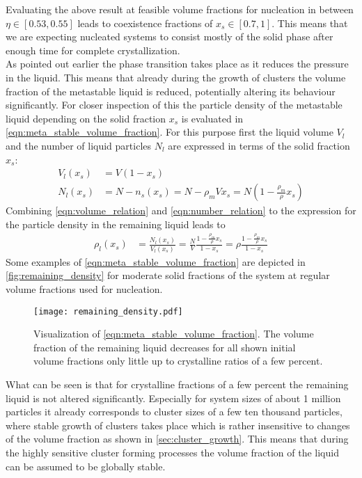 Evaluating the above result at feasible volume fractions for nucleation in between $\eta \in [0.53,0.55]$ leads to coexistence fractions of $x_s \in [0.7,1]$. This means that we are expecting nucleated systems to consist mostly of the solid phase after enough time for complete crystallization.\\

As pointed out earlier the phase transition takes place as it reduces the pressure in the liquid. This means that already during the growth of clusters the volume fraction of the metastable liquid is reduced, potentially altering its behaviour significantly. For closer inspection of this the particle density of the metastable liquid depending on the solid fraction $x_s$ is evaluated in \autoref{eqn:meta_stable_volume_fraction}. For this purpose first the liquid volume $V_l$ and the number of liquid particles $N_l$ are expressed in terms of the solid fraction $x_s$:
\begin{align}
\label{eqn:volume_relation}
V_l(x_s) & = V(1-x_s)\\
\label{eqn:number_relation}
N_l(x_s) & = N-n_s(x_s) = N - \rho_m V x_s = N(1-\frac{\rho_m}{\rho}x_s)
\end{align}
Combining \autoref{eqn:volume_relation} and \autoref{eqn:number_relation} to the expression for the particle density in the remaining liquid leads to
\begin{align}
\label{eqn:meta_stable_volume_fraction}
\rho_l(x_s) &= \frac{N_l (x_s) }{ V_l(x_s) } = \frac{N}{V} \frac{1-\frac{\rho_m}{\rho}x_s}{1-x_s} = \rho \frac{1-\frac{\rho_m}{\rho}x_s}{1-x_s}
\end{align}
Some examples of \autoref{eqn:meta_stable_volume_fraction} are depicted in \autoref{fig:remaining_density} for moderate solid fractions of the system at regular volume fractions used for nucleation.\\
\begin{figure}[h]
\centering
\texttt{[image: remaining\_density.pdf]}
\caption[Density decrease of the fluid during crystallization]{Visualization of \autoref{eqn:meta_stable_volume_fraction}. The volume fraction of the remaining liquid decreases for all shown initial volume fractions only little up to crystalline ratios of a few percent.}
\label{fig:remaining_density}
\end{figure}
What can be seen is that for crystalline fractions of a few percent the remaining liquid is not altered significantly. Especially for system sizes of about 1 million particles it already corresponds to cluster sizes of a few ten thousand particles, where stable growth of clusters takes place which is rather insensitive to changes of the volume fraction as shown in \autoref{sec:cluster_growth}. This means that during the highly sensitive cluster forming processes the volume fraction of the liquid can be assumed to be globally stable.\\ 

